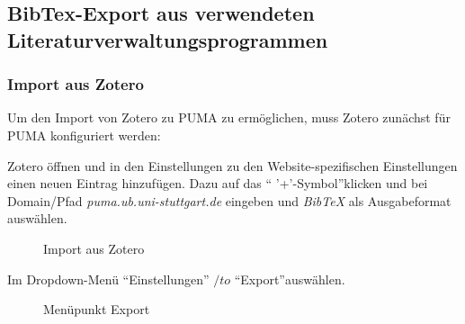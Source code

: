 \subsection{BibTex-Export aus verwendeten Literaturverwaltungsprogrammen}
\label{subsec:bibtexExport}
\subsubsection*{Import aus Zotero} \label{sss:importZotero}

Um den Import von Zotero zu PUMA zu ermöglichen, muss Zotero zunächst für PUMA konfiguriert werden:

Zotero öffnen und in den Einstellungen zu den Website-spezifischen Einstellungen einen neuen Eintrag hinzufügen. Dazu auf das \enquote{ '+'-Symbol}klicken und bei Domain/Pfad \textit{puma.ub.uni-stuttgart.de} eingeben und \textit{BibTeX} als Ausgabeformat auswählen.
\begin{figure}[h!]
 \centering
 \caption{Import aus Zotero}
 \label{fig:importZotero}
\end{figure}
Im Dropdown-Menü \enquote{Einstellungen} $/to$ \enquote{Export}auswählen.

\begin{figure}[h!]
 \centering
 \caption{Menüpunkt Export}
 \label{fig:menueExport}
\end{figure} 
    
